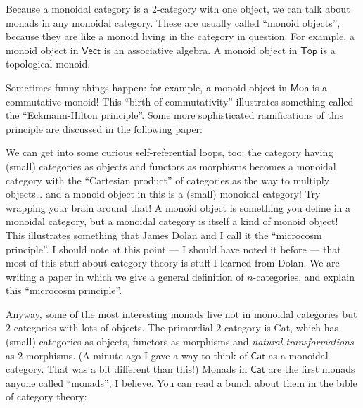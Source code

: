 \documentclass{article}
\def\tightlist{}
\renewcommand{\texttt}[1]{%
  \begingroup
  \ttfamily
  \begingroup\lccode`~=`/\lowercase{\endgroup\def~}{/\discretionary{}{}{}}%
  \begingroup\lccode`~=`[\lowercase{\endgroup\def~}{[\discretionary{}{}{}}%
  \begingroup\lccode`~=`.\lowercase{\endgroup\def~}{.\discretionary{}{}{}}%
  \catcode`/=\active\catcode`[=\active\catcode`.=\active
  \scantokens{#1\noexpand}%
  \endgroup
}
\begin{document}
Because a monoidal category is a \(2\)-category with one object, we can
talk about monads in any monoidal category. These are usually called
``monoid objects'', because they are like a monoid living in the
category in question. For example, a monoid object in \(\mathsf{Vect}\)
is an associative algebra. A monoid object in \(\mathsf{Top}\) is a
topological monoid.

Sometimes funny things happen: for example, a monoid object in
\(\mathsf{Mon}\) is a commutative monoid! This ``birth of
commutativity'' illustrates something called the ``Eckmann-Hilton
principle''. Some more sophisticated ramifications of this principle are
discussed in the following paper:


We can get into some curious self-referential loops, too: the category
having (small) categories as objects and functors as morphisms becomes a
monoidal category with the ``Cartesian product'' of categories as the
way to multiply objects\ldots{} and a monoid object in this is a (small)
monoidal category! Try wrapping your brain around that! A monoid object
is something you define in a monoidal category, but a monoidal category
is itself a kind of monoid object! This illustrates something that James
Dolan and I call it the ``microcosm principle''. I should note at this
point --- I should have noted it before --- that most of this stuff
about category theory is stuff I learned from Dolan. We are writing a
paper in which we give a general definition of \(n\)-categories, and
explain this ``microcosm principle''.

Anyway, some of the most interesting monads live not in monoidal
categories but \(2\)-categories with lots of objects. The primordial
\(2\)-category is Cat, which has (small) categories as objects, functors
as morphisms and \emph{natural transformations} as \(2\)-morphisms. (A
minute ago I gave a way to think of \(\mathsf{Cat}\) as a monoidal
category. That was a bit different than this!) Monads in
\(\mathsf{Cat}\) are the first monads anyone called ``monads'', I
believe. You can read a bunch about them in the bible of category
theory:
\end{document}
